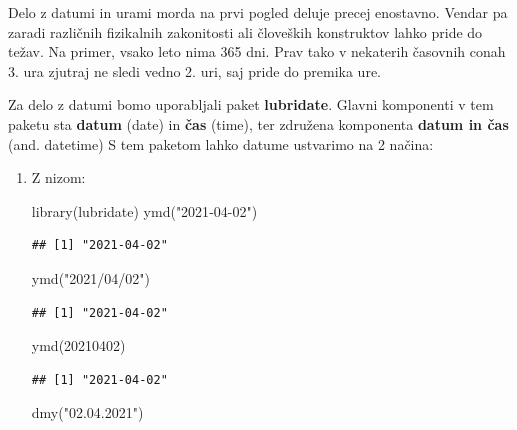 \documentclass[
]{book}
\newenvironment{Shaded}{\begin{snugshade}}{\end{snugshade}}
\newcommand{\DecValTok}[1]{\textcolor[rgb]{0.00,0.00,0.81}{#1}}
\newcommand{\FunctionTok}[1]{\textcolor[rgb]{0.00,0.00,0.00}{#1}}
\newcommand{\NormalTok}[1]{#1}
\newcommand{\StringTok}[1]{\textcolor[rgb]{0.31,0.60,0.02}{#1}}
\begin{document}
Delo z datumi in urami morda na prvi pogled deluje precej enostavno. Vendar pa zaradi različnih fizikalnih zakonitosti ali človeških konstruktov lahko pride do težav. Na primer, vsako leto nima 365 dni. Prav tako v nekaterih časovnih conah 3. ura zjutraj ne sledi vedno 2. uri, saj pride do premika ure.

Za delo z datumi bomo uporabljali paket \textbf{lubridate}. Glavni komponenti v tem paketu sta \textbf{datum} (date) in \textbf{čas} (time), ter združena komponenta \textbf{datum in čas} (and. datetime) S tem paketom lahko datume ustvarimo na 2 načina:

\begin{enumerate}
\def\labelenumi{\arabic{enumi})}
\item
  Z nizom:

\begin{Shaded}
\begin{Highlighting}[]
\FunctionTok{library}\NormalTok{(lubridate)}
\FunctionTok{ymd}\NormalTok{(}\StringTok{"2021{-}04{-}02"}\NormalTok{)}
\end{Highlighting}
\end{Shaded}

\begin{verbatim}
## [1] "2021-04-02"
\end{verbatim}

\begin{Shaded}
\begin{Highlighting}[]
\FunctionTok{ymd}\NormalTok{(}\StringTok{"2021/04/02"}\NormalTok{)}
\end{Highlighting}
\end{Shaded}

\begin{verbatim}
## [1] "2021-04-02"
\end{verbatim}

\begin{Shaded}
\begin{Highlighting}[]
\FunctionTok{ymd}\NormalTok{(}\DecValTok{20210402}\NormalTok{)}
\end{Highlighting}
\end{Shaded}

\begin{verbatim}
## [1] "2021-04-02"
\end{verbatim}

\begin{Shaded}
\begin{Highlighting}[]
\FunctionTok{dmy}\NormalTok{(}\StringTok{"02.04.2021"}\NormalTok{)}
\end{Highlighting}
\end{Shaded}


\end{enumerate}
\end{document}
